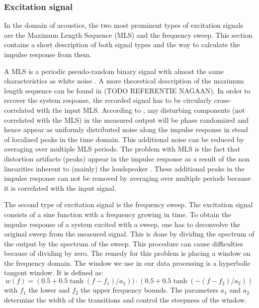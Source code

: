 \subsubsection{Excitation signal}\label{exc}
In the domain of acoustics, the two most prominent types of excitation signals are the Maximum Length Sequence (MLS) and the frequency sweep.
This section contains a short description of both signal types and the way to calculate the impulse response from them. 


A MLS is a periodic pseudo-random binary signal with almost the same characteristics as white noise \cite{Stan}. A more theoretical description of the maximum length sequence can be found in \cite{mls} (TODO REFERENTIE NAGAAN).  In order to recover the system response, the recorded signal has to be circularly cross-correlated with the input MLS. According to \cite{Stan}, any disturbing components (not correlated with the MLS) in the measured output will be phase randomized and hence appear as uniformly distributed noise along the impulse response in stead of localized peaks in the time domain. This additional noise can be reduced by averaging over multiple MLS periods. The problem with MLS is the fact that distortion artifacts (peaks) appear in the impulse response as a result of the non linearities inherent to (mainly) the loudspeaker \cite{Geetere}. These additional peaks in the impulse response can not be removed by averaging over multiple periods because it is correlated with the input signal.

The second type of excitation signal is the frequency sweep. The excitation signal consists of a sine function with a frequency growing in time. To obtain the impulse response of a system excited with a sweep, one has to deconvolve the original sweep from the measured signal. This is done by dividing the spectrum of the output by the spectrum of the sweep. This procedure can cause difficulties because of dividing by zero. The remedy for this problem is placing a window on the frequency domain. The window we use in our data processing is a hyperbolic tangent window. It is defined as:
\[
w(f) = (0.5 + 0.5 \tanh(f - f_1)/a_1)) \cdot (0.5 + 0.5 \tanh(-(f - f_2)/a_2))
\]
with $f_1$ the lower and $f_2$ the upper frequency bounds. The parameters $a_1$ and $a_2$ determine the width of the transitions and control the steepness of the window.

